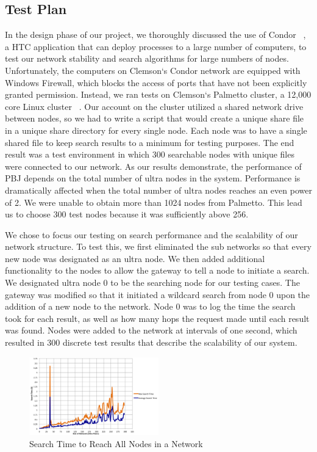 \documentclass{acm_proc_article-sp}
\begin{document}
\subsection{Test Plan}
In the design phase of our project, we thoroughly discussed the use of Condor ~\cite{condor}, a HTC application that can deploy processes to a large number of computers, to test our network stability and search algorithms for large numbers of nodes. Unfortunately, the computers on Clemson`s Condor network are equipped with Windows Firewall, which blocks the access of ports that have not been explicitly granted permission. Instead, we ran tests on Clemson`s Palmetto cluster, a 12,000 core Linux cluster ~\cite{palmetto}. Our account on the cluster utilized a shared network drive between nodes, so we had to write a script that would create a unique share file in a unique share directory for every single node. Each node was to have a single shared file to keep search results to a minimum for testing purposes. The end result was a test environment in which 300 searchable nodes with unique files were connected to our network.  As our results demonstrate, the performance of PBJ depends on the total number of ultra nodes in the system. Performance is dramatically affected when the total number of ultra nodes reaches an even power of 2. We were unable to obtain more than 1024 nodes from Palmetto. This lead us to choose 300 test nodes because it was sufficiently above 256.     


We chose to focus our testing on search performance and the scalability of our network structure. To test this, we first eliminated the sub networks so that every new node was designated as an ultra node. We then added additional functionality to the nodes to allow the gateway to tell a node to initiate a search. We designated ultra node 0 to be the searching node for our testing cases. The gateway was modified so that it initiated a wildcard search from node 0 upon the addition of a new node to the network. Node 0 was to log the time the search took for each result, as well as how many hops the request made until each result was found. Nodes were added to the network at intervals of one second, which resulted in 300 discrete test results that describe the scalability of our system. 

\begin{figure}[tbh]
\centering
\includegraphics[width=0.5\textwidth]{searchTime}
\caption{Search Time to Reach All Nodes in a Network}
\end{figure}
\end{document}
